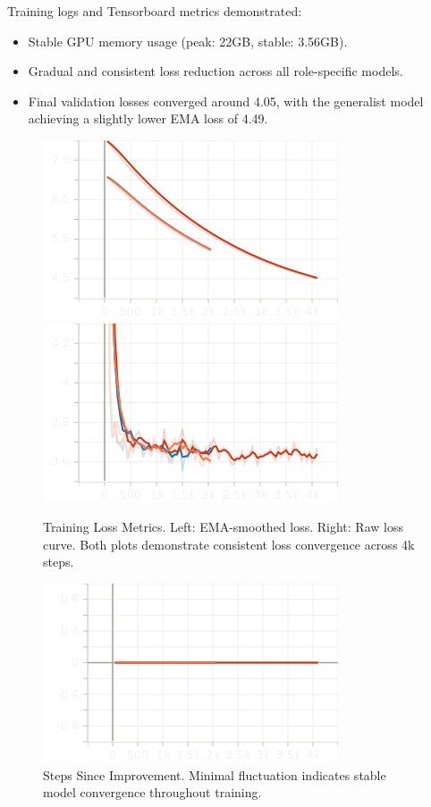\documentclass[11pt]{article}
\begin{document}
Training logs and Tensorboard metrics demonstrated:
\begin{itemize}
    \item Stable GPU memory usage (peak: 22GB, stable: 3.56GB).
    \item Gradual and consistent loss reduction across all role-specific models.
    \item Final validation losses converged around 4.05, with the generalist model achieving a slightly lower EMA loss of 4.49.
\end{itemize}

\begin{figure}[h!]
    \centering
    \includegraphics[width=0.45\linewidth]{figures/finetuning/loss_ema.png}
    \includegraphics[width=0.45\linewidth]{figures/finetuning/loss_raw.png}
    \caption{Training Loss Metrics. Left: EMA-smoothed loss. Right: Raw loss curve. Both plots demonstrate consistent loss convergence across 4k steps.}
    \label{fig:loss_plots}
\end{figure}

\begin{figure}[h!]
    \centering
    \includegraphics[width=0.6\linewidth]{figures/finetuning/steps_since_improvement.png}
    \caption{Steps Since Improvement. Minimal fluctuation indicates stable model convergence throughout training.}
    \label{fig:steps_since_improvement}
\end{figure}
\end{document}
